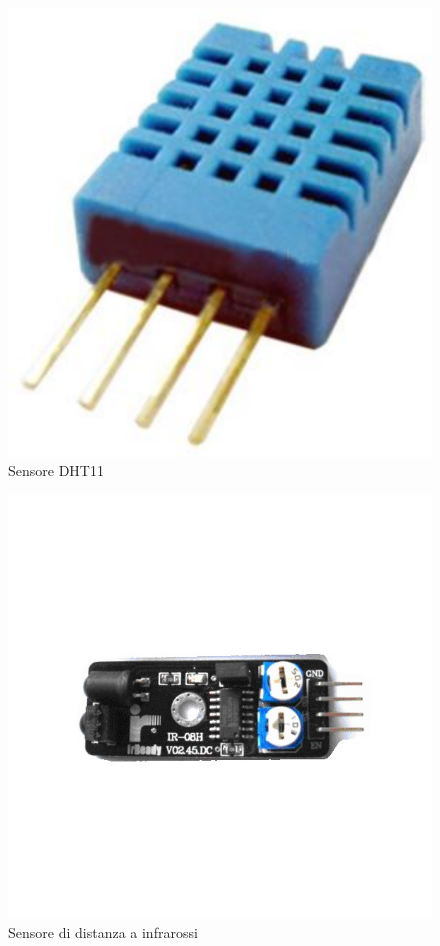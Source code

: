 \documentclass[a4paper,titlepage]{book}
\begin{document}
\begin{figure}[!ht]
\centering
\includegraphics[scale=0.5]{DHT11.png}
\caption{Sensore DHT11}
\end{figure}


\begin{figure}[!ht]
\centering
\includegraphics[scale=0.5]{dist1.jpg}
\caption{Sensore di distanza a infrarossi}
\end{figure}
\end{document}
